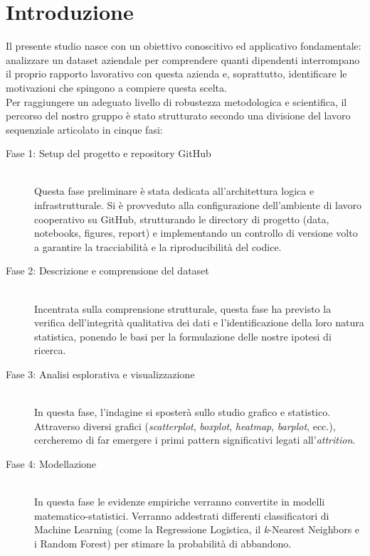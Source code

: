 \documentclass{article}
\begin{document}
\section{Introduzione}
Il presente studio nasce con un obiettivo conoscitivo ed applicativo fondamentale: analizzare un dataset aziendale per comprendere quanti dipendenti interrompano il proprio rapporto lavorativo con questa azienda e, soprattutto, identificare le motivazioni che spingono a compiere questa scelta.  \\
Per raggiungere un adeguato livello di robustezza metodologica e scientifica, il percorso del nostro gruppo è stato strutturato secondo una divisione del lavoro sequenziale articolato in cinque fasi:
\begin{description}
    \item[Fase 1: Setup del progetto e repository GitHub]\mbox{}\\Questa fase preliminare è stata dedicata all'architettura logica e infrastrutturale. Si è provveduto alla configurazione dell'ambiente di lavoro cooperativo su GitHub, strutturando le directory di progetto (data, notebooks, figures, report) e implementando un controllo di versione volto a garantire la tracciabilità e la riproducibilità del codice.

  \item[Fase 2: Descrizione e comprensione del dataset]\mbox{}\\ Incentrata sulla comprensione strutturale, questa fase ha previsto la verifica dell'integrità qualitativa dei dati e l'identificazione della loro natura statistica, ponendo le basi per la formulazione delle nostre ipotesi di ricerca.

  \item[Fase 3: Analisi esplorativa e visualizzazione]\mbox{}\\In questa fase, l'indagine si sposterà sullo studio grafico e statistico. Attraverso diversi grafici (\textit{scatterplot}, \textit{boxplot}, \textit{heatmap}, \textit{barplot}, ecc.), cercheremo di far emergere i primi pattern significativi legati all'\textit{attrition}.

  \item[Fase 4: Modellazione]\mbox{}\\In questa fase le evidenze empiriche verranno convertite in modelli matematico-statistici. Verranno addestrati differenti classificatori di Machine Learning (come la Regressione Logistica, il \textit{k}-Nearest Neighbors e i Random Forest) per stimare la probabilità di abbandono.



\end{description}
\end{document}
